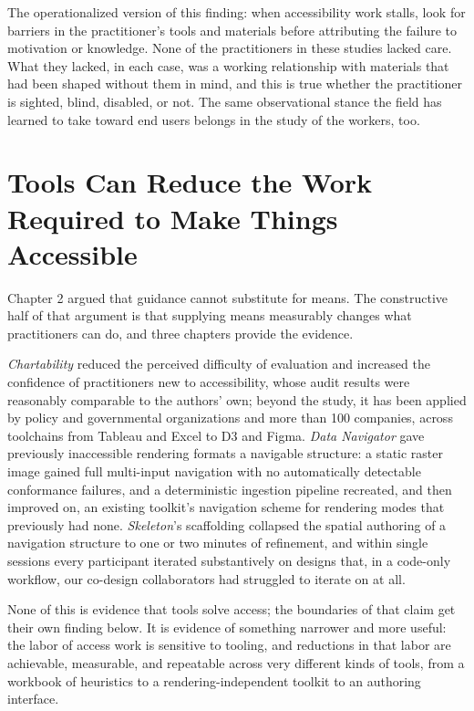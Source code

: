 \documentclass[12pt]{cmuthesis}
\begin{document}
The operationalized version of this finding: when accessibility work stalls, look for barriers in the practitioner's tools and materials before attributing the failure to motivation or knowledge. None of the practitioners in these studies lacked care. What they lacked, in each case, was a working relationship with materials that had been shaped without them in mind, and this is true whether the practitioner is sighted, blind, disabled, or not. The same observational stance the field has learned to take toward end users belongs in the study of the workers, too.

\section{Tools Can Reduce the Work Required to Make Things Accessible}

Chapter 2 argued that guidance cannot substitute for means. The constructive half of that argument is that supplying means measurably changes what practitioners can do, and three chapters provide the evidence.

\textit{Chartability} reduced the perceived difficulty of evaluation and increased the confidence of practitioners new to accessibility, whose audit results were reasonably comparable to the authors' own; beyond the study, it has been applied by policy and governmental organizations and more than 100 companies, across toolchains from Tableau and Excel to D3 and Figma. \textit{Data Navigator} gave previously inaccessible rendering formats a navigable structure: a static raster image gained full multi-input navigation with no automatically detectable conformance failures, and a deterministic ingestion pipeline recreated, and then improved on, an existing toolkit's navigation scheme for rendering modes that previously had none. \textit{Skeleton}'s scaffolding collapsed the spatial authoring of a navigation structure to one or two minutes of refinement, and within single sessions every participant iterated substantively on designs that, in a code-only workflow, our co-design collaborators had struggled to iterate on at all.

None of this is evidence that tools solve access; the boundaries of that claim get their own finding below. It is evidence of something narrower and more useful: the labor of access work is sensitive to tooling, and reductions in that labor are achievable, measurable, and repeatable across very different kinds of tools, from a workbook of heuristics to a rendering-independent toolkit to an authoring interface.
\end{document}
